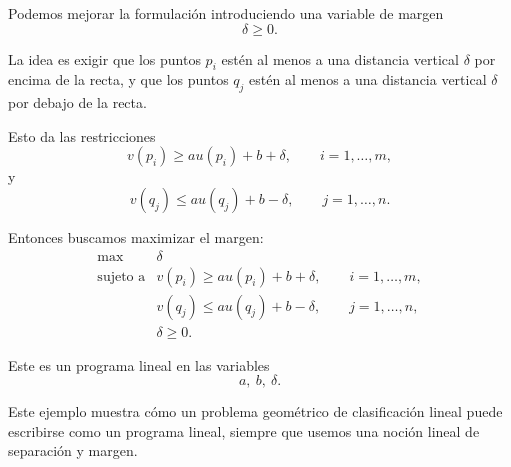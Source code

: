 Podemos mejorar la formulación introduciendo una variable de margen
\[
    \delta\geq 0.
\]

La idea es exigir que los puntos \(p_i\) estén al menos a una distancia vertical \(\delta\) por encima de la recta, y que los puntos \(q_j\) estén al menos a una distancia vertical \(\delta\) por debajo de la recta.

Esto da las restricciones
\[
    v(p_i)\geq au(p_i)+b+\delta,
    \qquad i=1,\dots,m,
\]
y
\[
    v(q_j)\leq au(q_j)+b-\delta,
    \qquad j=1,\dots,n.
\]

Entonces buscamos maximizar el margen:
\[
    \begin{array}{ll}
        \max & \delta\\[1mm]
        \text{sujeto a}
        &
        v(p_i)\geq au(p_i)+b+\delta,
        \qquad i=1,\dots,m,\\[1mm]
        &
        v(q_j)\leq au(q_j)+b-\delta,
        \qquad j=1,\dots,n,\\[1mm]
        &
        \delta\geq 0.
    \end{array}
\]

Este es un programa lineal en las variables
\[
    a,\ b,\ \delta.
\]

\begin{remark}
Este ejemplo muestra cómo un problema geométrico de clasificación lineal puede escribirse como un programa lineal, siempre que usemos una noción lineal de separación y margen.
\end{remark}
